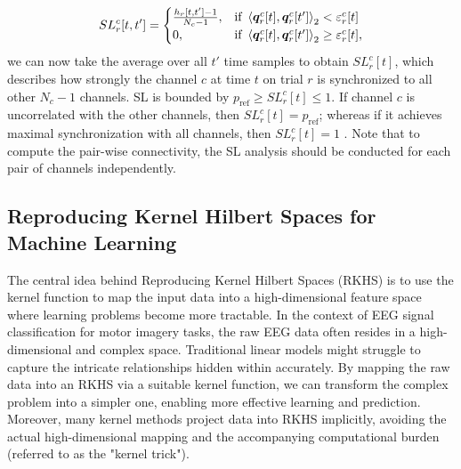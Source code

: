 {\begin{equation}
    SL^{c}_{r}[t,t'] =
    \begin{cases}
        \frac{h_{r}[t,t']-1}{N_c-1}, & \text{if } \left<\bm {q}^{c}_{r}[t],\bm {q}^{c}_{r}[t']\right>_{2} < \varepsilon^{c}_{r}[t]\\
        0, & \text{if } \left<\bm {q}^{c}_{r}[t],\bm {q}^{c}_{r}[t']\right>_{2} \geq \varepsilon^{c}_{r}[t],\\
    \end{cases}
\end{equation} 
we can now take the average over all $t'$ time samples to obtain $SL^{c}_{r}[t]$, which describes how strongly the channel $c$ at time $t$ on trial $r$ is synchronized to all other $N_c - 1$ channels. SL is bounded by $p_{\text{ref}} \geq SL^{c}_{r}[t] \leq 1$. If channel $c$ is uncorrelated with the other channels, then $SL^{c}_{r}[t] = p_{\text{ref}} $; whereas if it achieves maximal synchronization with all channels, then $SL^{c}_{r}[t]= 1$ \cite{gonzalez2021network}. Note that to compute the pair-wise connectivity, the SL analysis should be conducted for each pair of channels independently.
}

\subsection{Reproducing Kernel Hilbert Spaces for Machine Learning}

The central idea behind Reproducing Kernel Hilbert Spaces (RKHS) is to use the kernel function to map the input data into a high-dimensional feature space where learning problems become more tractable. In the context of EEG signal classification for motor imagery tasks, the raw EEG data often resides in a high-dimensional and complex space. Traditional linear models might struggle to capture the intricate relationships hidden within accurately. By mapping the raw data into an RKHS via a suitable kernel function, we can transform the complex problem into a simpler one, enabling more effective learning and prediction. Moreover, many kernel methods project data into RKHS implicitly, avoiding the actual high-dimensional mapping and the accompanying computational burden (referred to as the "kernel trick").

